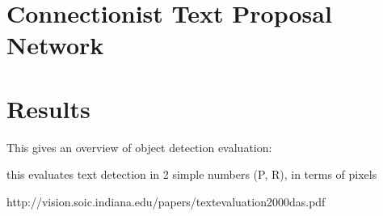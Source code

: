 

\section{Connectionist Text Proposal Network}\label{sec:ctpn}






\section{Results}\label{sec:detection_results}
	This gives an overview of object detection evaluation:


	this evaluates text detection in 2 simple numbers (P, R), in terms of pixels

	http://vision.soic.indiana.edu/papers/textevaluation2000das.pdf



